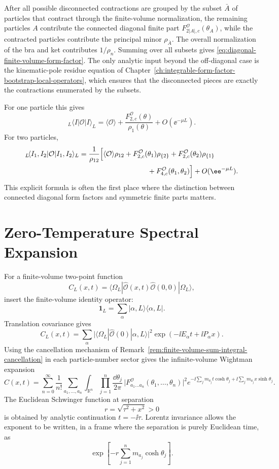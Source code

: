After all possible disconnected contractions are grouped by the subset
\(\bar A\) of particles that contract through the finite-volume
normalization, the remaining particles \(A\) contribute the connected
diagonal finite part \(F^{\mathcal O}_{2|A|,c}(\theta_A)\), while the
contracted particles contribute the principal minor \(\rho_{\bar A}\).  The
overall normalization of the bra and ket contributes \(1/\rho_n\).  Summing
over all subsets gives \eqref{eq:diagonal-finite-volume-form-factor}.
The only analytic input beyond the off-diagonal case is the kinematic-pole
residue equation of Chapter~\ref{ch:integrable-form-factor-bootstrap-local-operators},
which ensures that the disconnected pieces are exactly the contractions
enumerated by the subsets.

For one particle this gives
\[
  {}_L\!\langle I|\mathcal O|I\rangle_L
  =
  \langle\mathcal O\rangle
  +
  \frac{F^{\mathcal O}_{2,c}(\theta)}{\rho_1(\theta)}
  +
  O(\ee^{-\mu L}).
\]
For two particles,
\[
\begin{aligned}
  {}_L\!\langle I_1,I_2|\mathcal O|I_1,I_2\rangle_L
  &=
  \frac{1}{\rho_{12}}
  \Bigl[
    \langle\mathcal O\rangle\rho_{12}
    +F_{2,c}^{\mathcal O}(\theta_1)\rho_{\{2\}}
    +F_{2,c}^{\mathcal O}(\theta_2)\rho_{\{1\}}  \\
  &\hspace{3.4cm}
    +F_{4,c}^{\mathcal O}(\theta_1,\theta_2)
  \Bigr]
  +
  O(\ee^{-\mu L}).
\end{aligned}
\]
This explicit formula is often the first place where the distinction between
connected diagonal form factors and symmetric finite parts matters.

\section{Zero-Temperature Spectral Expansion}

For a finite-volume two-point function
\[
  C_L(x,t)=
  \langle\Omega_L|
  \widehat{\mathcal O}(x,t)\widehat{\mathcal O}(0,0)
  |\Omega_L\rangle ,
\]
insert the finite-volume identity operator:
\[
  \mathbf 1_L=\sum_\alpha|\alpha,L\rangle\langle\alpha,L|.
\]
Translation covariance gives
\[
  C_L(x,t)
  =
  \sum_\alpha
  \bigl|
    \langle\Omega_L|\widehat{\mathcal O}(0)|\alpha,L\rangle
  \bigr|^2
  \exp(-\ii E_\alpha t+\ii P_\alpha x).
\]
Using the cancellation mechanism of
Remark~\ref{rem:finite-volume-sum-integral-cancellation} in each
particle-number sector gives the infinite-volume Wightman expansion
\begin{equation}
  C(x,t)
  =
  \sum_{n=0}^{\infty}
  \frac{1}{n!}
  \sum_{a_1,\ldots,a_n}
  \int_{\mathbb R^n}
  \prod_{j=1}^n\frac{\dd\theta_j}{2\pi}\,
  \bigl|
    F^{\mathcal O}_{a_1\ldots a_n}(\theta_1,\ldots,\theta_n)
  \bigr|^2
  e^{-\ii\sum_j m_{a_j}t\cosh\theta_j
      +\ii\sum_j m_{a_j}x\sinh\theta_j}.
  \label{eq:zero-temperature-form-factor-spectral-expansion}
\end{equation}
The Euclidean Schwinger function at separation
\[
  r=\sqrt{\tau^2+x^2}>0
\]
is obtained by analytic continuation \(t=-\ii\tau\).  Lorentz invariance
allows the exponent to be written, in a frame where the separation is purely
Euclidean time, as
\[
  \exp\left[-r\sum_{j=1}^n m_{a_j}\cosh\theta_j\right].
\]

